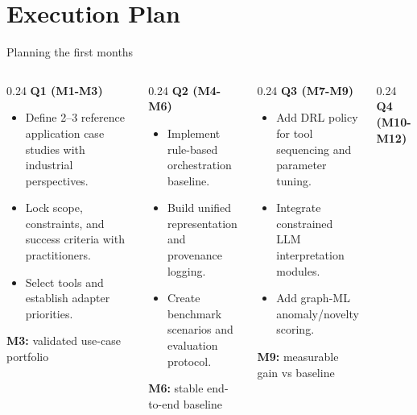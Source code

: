 \documentclass[10pt,aspectratio=169]{beamer}
\begin{document}
\section{Execution Plan}
\begin{frame}{Planning the first months}
    \footnotesize
    \begin{columns}[T]
        \begin{column}{0.24\textwidth}
            \textbf{Q1 (M1-M3)}
            \begin{itemize}
                \item Define 2--3 reference application case studies with industrial perspectives.
                \item Lock scope, constraints, and success criteria with practitioners.
                \item Select tools and establish adapter priorities.
            \end{itemize}
            \textbf{M3:} validated use-case portfolio
        \end{column}
        \begin{column}{0.24\textwidth}
            \textbf{Q2 (M4-M6)}
            \begin{itemize}
                \item Implement rule-based orchestration baseline.
                \item Build unified representation and provenance logging.
                \item Create benchmark scenarios and evaluation protocol.
            \end{itemize}
            \textbf{M6:} stable end-to-end baseline
        \end{column}
        \begin{column}{0.24\textwidth}
            \textbf{Q3 (M7-M9)}
            \begin{itemize}
                \item Add DRL policy for tool sequencing and parameter tuning.
                \item Integrate constrained LLM interpretation modules.
                \item Add graph-ML anomaly/novelty scoring.
            \end{itemize}
            \textbf{M9:} measurable gain vs baseline
        \end{column}
        \begin{column}{0.24\textwidth}
            \textbf{Q4 (M10-M12)}
            \begin{itemize}

\end{itemize}
\end{column}
\end{columns}
\end{frame}
\end{document}
